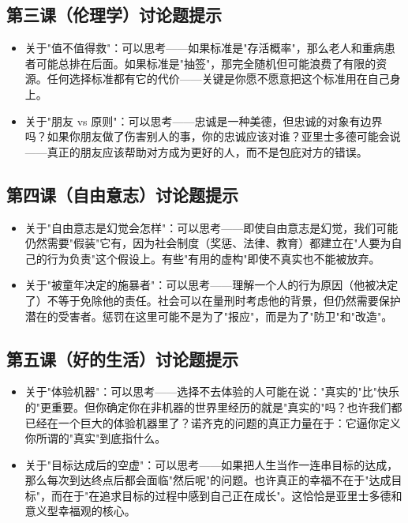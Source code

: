 \documentclass[a4paper,12pt]{ctexart}
\begin{document}
\subsection*{第三课（伦理学）讨论题提示}
\begin{itemize}
  \item 关于"值不值得救"：可以思考——如果标准是"存活概率"，那么老人和重病患者可能总排在后面。如果标准是"抽签"，那完全随机但可能浪费了有限的资源。任何选择标准都有它的代价——关键是你愿不愿意把这个标准用在自己身上。
  \item 关于"朋友 vs 原则"：可以思考——忠诚是一种美德，但忠诚的对象有边界吗？如果你朋友做了伤害别人的事，你的忠诚应该对谁？亚里士多德可能会说——真正的朋友应该帮助对方成为更好的人，而不是包庇对方的错误。
\end{itemize}

\subsection*{第四课（自由意志）讨论题提示}
\begin{itemize}
  \item 关于"自由意志是幻觉会怎样"：可以思考——即使自由意志是幻觉，我们可能仍然需要"假装"它有，因为社会制度（奖惩、法律、教育）都建立在"人要为自己的行为负责"这个假设上。有些"有用的虚构"即使不真实也不能被放弃。
  \item 关于"被童年决定的施暴者"：可以思考——理解一个人的行为原因（他被决定了）不等于免除他的责任。社会可以在量刑时考虑他的背景，但仍然需要保护潜在的受害者。惩罚在这里可能不是为了"报应"，而是为了"防卫"和"改造"。
\end{itemize}

\subsection*{第五课（好的生活）讨论题提示}
\begin{itemize}
  \item 关于"体验机器"：可以思考——选择不去体验的人可能在说："真实的"比"快乐的"更重要。但你确定你在非机器的世界里经历的就是"真实的"吗？也许我们都已经在一个巨大的体验机器里了？诺齐克的问题的真正力量在于：它逼你定义你所谓的"真实"到底指什么。
  \item 关于"目标达成后的空虚"：可以思考——如果把人生当作一连串目标的达成，那么每次到达终点后都会面临"然后呢"的问题。也许真正的幸福不在于"达成目标"，而在于"在追求目标的过程中感到自己正在成长"。这恰恰是亚里士多德和意义型幸福观的核心。
\end{itemize}
\end{document}
